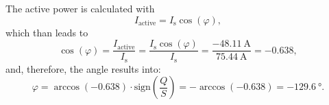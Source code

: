 
\begin{solutionblock}
    The active power is calculated with
    \begin{equation}
        I_{\mathrm{active}} = I_{\mathrm{s}} \cos(\varphi),
    \end{equation}
    which than leads to
    \begin{equation}
        \cos(\varphi) = \frac{I_{\mathrm{active}}}{I_{\mathrm{s}}} 
        = \frac{I_{\mathrm{s}}\cos(\varphi)}{I_{\mathrm{s}}}
        = \frac{-\SI{48.11}{\ampere}}{\SI{75.44}{\ampere}}
        = -0.638,
    \end{equation}
    and, therefore, the angle results into:
    \begin{equation}
        \varphi = \arccos(-0.638)\cdot \mathrm{sign}\left(\frac{Q}{S}\right)
        = -\arccos(-0.638) = \SI{-129.6}{\degree}.
    \end{equation}
\end{solutionblock}








